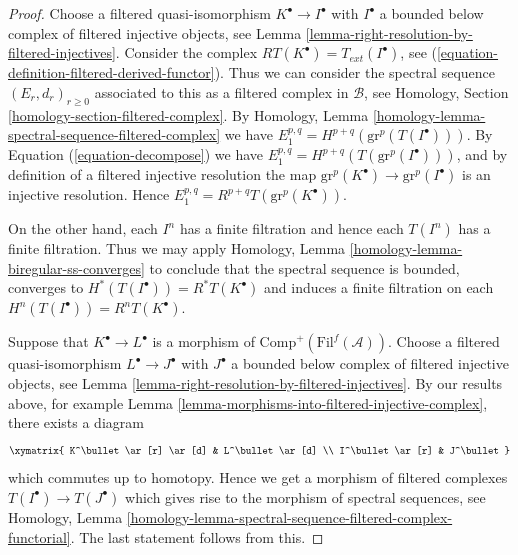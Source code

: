 \begin{proof}
Choose a filtered quasi-isomorphism $K^\bullet \to I^\bullet$
with $I^\bullet$ a bounded below complex of filtered injective objects, see
Lemma \ref{lemma-right-resolution-by-filtered-injectives}.
Consider the complex $RT(K^\bullet) = T_{ext}(I^\bullet)$, see
(\ref{equation-definition-filtered-derived-functor}).
Thus we can consider the spectral sequence
$(E_r, d_r)_{r \geq 0}$ associated to
this as a filtered complex in $\mathcal{B}$, see
Homology, Section \ref{homology-section-filtered-complex}.
By
Homology, Lemma \ref{homology-lemma-spectral-sequence-filtered-complex}
we have $E_1^{p, q} = H^{p + q}(\text{gr}^p(T(I^\bullet)))$.
By Equation (\ref{equation-decompose}) we have
$E_1^{p, q} = H^{p + q}(T(\text{gr}^p(I^\bullet)))$, and
by definition of a filtered injective resolution the
map $\text{gr}^p(K^\bullet) \to \text{gr}^p(I^\bullet)$
is an injective resolution. Hence
$E_1^{p, q} = R^{p + q}T(\text{gr}^p(K^\bullet))$.

\medskip\noindent
On the other hand, each $I^n$ has a finite filtration and hence
each $T(I^n)$ has a finite filtration. Thus we may apply
Homology, Lemma \ref{homology-lemma-biregular-ss-converges}
to conclude that the spectral sequence is bounded, converges to
$H^*(T(I^\bullet)) = R^*T(K^\bullet)$
and induces a finite filtration on each $H^n(T(I^\bullet)) = R^nT(K^\bullet)$.

\medskip\noindent
Suppose that $K^\bullet \to L^\bullet$ is a morphism of
$\text{Comp}^{+}(\text{Fil}^f(\mathcal{A}))$.
Choose a filtered quasi-isomorphism $L^\bullet \to J^\bullet$
with $J^\bullet$ a bounded below complex of filtered injective
objects, see
Lemma \ref{lemma-right-resolution-by-filtered-injectives}.
By our results above,
for example
Lemma \ref{lemma-morphisms-into-filtered-injective-complex},
there exists a diagram
$$
\xymatrix{
K^\bullet \ar[r] \ar[d] & L^\bullet \ar[d] \\
I^\bullet \ar[r] & J^\bullet
}
$$
which commutes up to homotopy. Hence we get a morphism of filtered
complexes $T(I^\bullet) \to T(J^\bullet)$ which gives rise to the
morphism of spectral sequences, see
Homology,
Lemma \ref{homology-lemma-spectral-sequence-filtered-complex-functorial}.
The last statement follows from this.
\end{proof}

